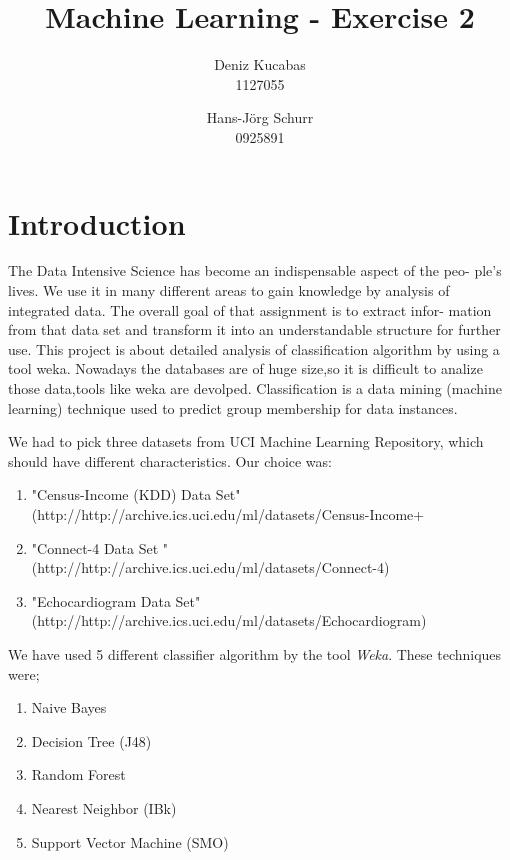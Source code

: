 \documentclass[a4paper]{article}
\begin{document}
\title{Machine Learning - Exercise 2 }
\author{
        Deniz Kucabas \\ 
                     1127055 
                    \and
                    Hans-Jörg Schurr \\ 0925891
}

\maketitle
\tableofcontents
\newpage

\section{Introduction}
The Data Intensive Science has become an indispensable aspect of the peo-
ple's lives. We use it in many different areas to gain knowledge by analysis
of integrated data. The overall goal of that assignment is to extract infor-
mation from that data set and transform it into an understandable structure
for further use. This project is about detailed analysis of classification algorithm by using a tool weka.
Nowadays the databases are of huge size,so it is difficult to analize those data,tools like weka are 
devolped. Classification is a data mining (machine learning) technique used 
to predict group membership for data instances. 

We had to pick three datasets from UCI Machine Learning Repository, which should have different characteristics. 
Our choice was:
\begin{enumerate}
    \item "Census-Income (KDD) Data Set" \\ 
(http://http://archive.ics.uci.edu/ml/datasets/Census-Income+%
    \item "Connect-4 Data Set " \\
        (http://http://archive.ics.uci.edu/ml/datasets/Connect-4)
    \item "Echocardiogram  Data Set" \\
        (http://http://archive.ics.uci.edu/ml/datasets/Echocardiogram)
\end{enumerate}

We have used 5 different classifier algorithm by the tool \emph{Weka}. 
These techniques were;
\begin{enumerate}
    \item Naive Bayes
    \item Decision Tree (J48)
    \item Random Forest
    \item Nearest Neighbor (IBk)
    \item Support Vector Machine (SMO)
\end{enumerate}
\end{document}
